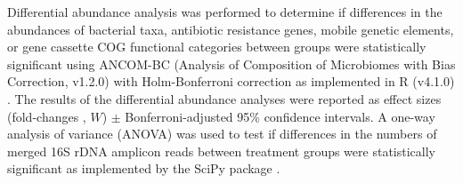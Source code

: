 Differential abundance analysis was performed to determine if differences in the abundances of bacterial taxa, antibiotic resistance genes, mobile genetic elements, or gene cassette COG functional categories between groups were statistically significant using ANCOM-BC (Analysis of Composition of Microbiomes with Bias Correction, v1.2.0) with Holm-Bonferroni correction as implemented in R (v4.1.0) \parencite{RCoreTeam.2021, Lin.2020}.
The results of the differential abundance analyses were reported as effect sizes (fold-changes , $W$) $\pm$ Bonferroni-adjusted 95\% confidence intervals.
A one-way analysis of variance (ANOVA) was used to test if differences in the numbers of merged 16S rDNA amplicon reads between treatment groups were statistically significant as implemented by the SciPy package \parencite{Virtanen.2020}.
